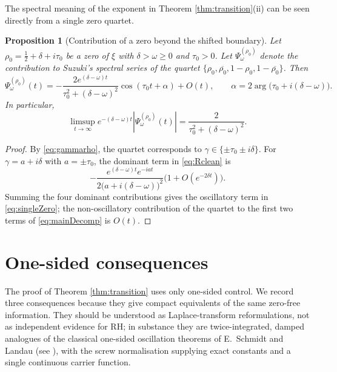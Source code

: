 \documentclass[11pt,reqno]{amsart}
\theoremstyle{plain}
\newtheorem{proposition}[theorem]{Proposition}
\theoremstyle{definition}
\begin{document}
The spectral meaning of the exponent in Theorem \ref{thm:transition}(ii) can be seen directly from
a single zero quartet.

\begin{proposition}[Contribution of a zero beyond the shifted boundary]\label{prop:sens}
Let $\rho_0=\tfrac12+\delta+i\tau_0$ be a zero of $\xi$ with $\delta>\omega\ge0$ and $\tau_0>0$.
Let $\Psi_\omega^{(\rho_0)}$ denote the contribution to Suzuki's spectral series of the quartet
$\{\rho_0,\overline{\rho_0},1-\rho_0,1-\overline{\rho_0}\}$.  Then
\begin{equation}\label{eq:singleZero}
 \Psi_\omega^{(\rho_0)}(t)
 =-\frac{2e^{(\delta-\omega)t}}{\tau_0^2+(\delta-\omega)^2}
 \cos(\tau_0t+\alpha)+O(t),
 \qquad
 \alpha=2\arg\bigl(\tau_0+i(\delta-\omega)\bigr).
\end{equation}
In particular,
\[
 \limsup_{t\to\infty}e^{-(\delta-\omega)t}
 \left|\Psi_\omega^{(\rho_0)}(t)\right|
 =\frac{2}{\tau_0^2+(\delta-\omega)^2}.
\]
\end{proposition}

\begin{proof}
By \eqref{eq:gammarho}, the quartet corresponds to
$\gamma\in\{\pm\tau_0\pm i\delta\}$.  For $\gamma=a+i\delta$ with $a=\pm\tau_0$, the dominant term
in \eqref{eq:Rclean} is
\[
 -\frac{e^{(\delta-\omega)t}e^{-iat}}
 {2\bigl(a+i(\delta-\omega)\bigr)^2}
 \bigl(1+O(e^{-2\delta t})\bigr).
\]
Summing the four dominant contributions gives the oscillatory term in \eqref{eq:singleZero}; the
non-oscillatory contribution of the quartet to the first two terms of \eqref{eq:mainDecomp} is
$O(t)$.
\end{proof}

\section{One-sided consequences}\label{sec:onesided}

The proof of Theorem \ref{thm:transition} uses only one-sided control.  We record three consequences
because they give compact equivalents of the same zero-free information.  They should be understood
as Laplace-transform reformulations, not as independent evidence for RH; in substance they are
twice-integrated, damped analogues of the classical one-sided oscillation theorems of E.~Schmidt
and Landau (see \cite[Ch.~V]{Ingham}), with the screw normalisation supplying exact constants and
a single continuous carrier function.
\end{document}
